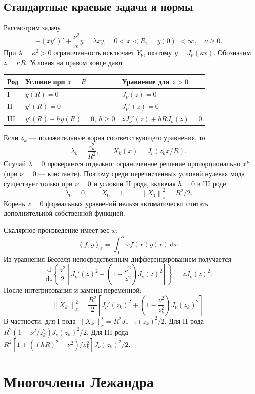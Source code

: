 \documentclass[12pt,a4paper]{article}
\newcommand{\dd}{\,\mathrm{d}}
\newcommand{\norm}[1]{\left\lVert#1\right\rVert}
\newcommand{\ip}[2]{\left\langle#1,#2\right\rangle}
\begin{document}
\subsection{Стандартные краевые задачи и нормы}
Рассмотрим задачу
\begin{equation}\label{eq:SLB}
-(xy')'+\frac{\nu^2}{x}y=\lambda xy,
\quad 0<x<R,\quad |y(0)|<\infty,\quad \nu\ge0.
\end{equation}
При $\lambda=\kappa^2>0$ ограниченность исключает $Y_\nu$, поэтому $y=J_\nu(\kappa x)$. Обозначим $z=\kappa R$. Условия на правом конце дают
\begin{center}
\begin{tabular}{lll}\toprule
Род & Условие при $x=R$ & Уравнение для $z>0$\\\midrule
I & $y(R)=0$ & $J_\nu(z)=0$\\
II & $y'(R)=0$ & $J_\nu'(z)=0$\\
III & $y'(R)+hy(R)=0$, $h\ge0$ & $zJ_\nu'(z)+hRJ_\nu(z)=0$\\\bottomrule
\end{tabular}
\end{center}
Если $z_k$ --- положительные корни соответствующего уравнения, то
\[
\lambda_k=\frac{z_k^2}{R^2},\qquad X_k(x)=J_\nu(z_kx/R).
\]
Случай $\lambda=0$ проверяется отдельно: ограниченное решение пропорционально $x^\nu$ (при $\nu=0$ --- константе). Поэтому среди перечисленных условий нулевая мода существует только при $\nu=0$ и условии II рода, включая $h=0$ в III роде:
\[
\lambda_0=0,\qquad X_0=1,\qquad \norm{X_0}_x^2=R^2/2.
\]
Корень $z=0$ формальных уравнений нельзя автоматически считать дополнительной собственной функцией.

Скалярное произведение имеет вес $x$:
\[
\ip{f}{g}_x=\int_0^R x f(x)\overline{g(x)}\dd x.
\]
Из уравнения Бесселя непосредственным дифференцированием получается
\[
\frac{\mathrm d}{\mathrm dz}\left\{\frac{z^2}{2}
\left[J_\nu'(z)^2+\left(1-\frac{\nu^2}{z^2}\right)J_\nu(z)^2\right]\right\}=zJ_\nu(z)^2.
\]
После интегрирования и замены переменной:
\begin{equation}\label{eq:normB}
\norm{X_k}_x^2=\frac{R^2}{2}
\left[J_\nu'(z_k)^2+\left(1-\frac{\nu^2}{z_k^2}\right)J_\nu(z_k)^2\right].
\end{equation}
В частности, для I рода $\norm{X_k}_x^2=R^2J_{\nu+1}(z_k)^2/2$. Для II рода --- $R^2(1-\nu^2/z_k^2)J_\nu(z_k)^2/2$. Для III рода --- $R^2[1+((hR)^2-\nu^2)/z_k^2]J_\nu(z_k)^2/2$.

\section{Многочлены Лежандра}
\end{document}

